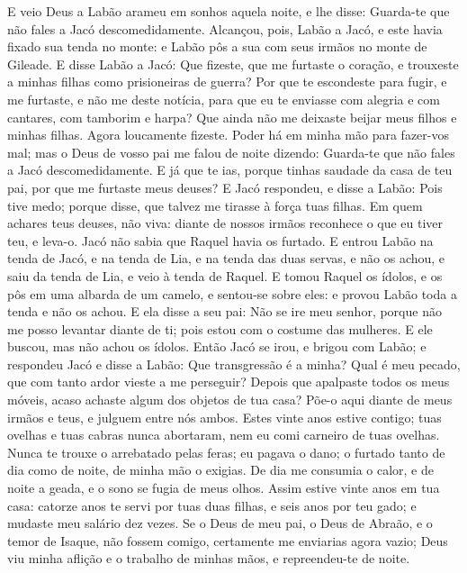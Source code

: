 {{E veio Deus a Labão arameu em sonhos aquela noite, e lhe disse: Guarda-te que não fales a Jacó descomedidamente.
Alcançou, pois, Labão a Jacó, e este havia fixado sua tenda no monte: e Labão pôs a sua com seus irmãos no monte de Gileade.
E disse Labão a Jacó: Que fizeste, que me furtaste o coração, e trouxeste a minhas filhas como prisioneiras de guerra?
Por que te escondeste para fugir, e me furtaste, e não me deste notícia, para que eu te enviasse com alegria e com cantares, com tamborim e harpa?
Que ainda não me deixaste beijar meus filhos e minhas filhas. Agora loucamente fizeste.
Poder há em minha mão para fazer-vos mal; mas o Deus de vosso pai me falou de noite dizendo: Guarda-te que não fales a Jacó descomedidamente.
E já que te ias, porque tinhas saudade da casa de teu pai, por que me furtaste meus deuses?
E Jacó respondeu, e disse a Labão: Pois tive medo; porque disse, que talvez me tirasse à força tuas filhas.
Em quem achares teus deuses, não viva: diante de nossos irmãos reconhece o que eu tiver teu, e leva-o. Jacó não sabia que Raquel havia os furtado.
E entrou Labão na tenda de Jacó, e na tenda de Lia, e na tenda das duas servas, e não os achou, e saiu da tenda de Lia, e veio à tenda de Raquel.
E tomou Raquel os ídolos, e os pôs em uma albarda de um camelo, e sentou-se sobre eles: e provou Labão toda a tenda e não os achou.
E ela disse a seu pai: Não se ire meu senhor, porque não me posso levantar diante de ti; pois estou com o costume das mulheres. E ele buscou, mas não achou os ídolos.
Então Jacó se irou, e brigou com Labão; e respondeu Jacó e disse a Labão: Que transgressão é a minha? Qual é meu pecado, que com tanto ardor vieste a me perseguir?
Depois que apalpaste todos os meus móveis, acaso achaste algum dos objetos de tua casa? Põe-o aqui diante de meus irmãos e teus, e julguem entre nós ambos.
Estes vinte anos estive contigo; tuas ovelhas e tuas cabras nunca abortaram, nem eu comi carneiro de tuas ovelhas.
Nunca te trouxe o arrebatado pelas feras; eu pagava o dano; o furtado tanto de dia como de noite, de minha mão o exigias.
De dia me consumia o calor, e de noite a geada, e o sono se fugia de meus olhos.
Assim estive vinte anos em tua casa: catorze anos te servi por tuas duas filhas, e seis anos por teu gado; e mudaste meu salário dez vezes.
Se o Deus de meu pai, o Deus de Abraão, e o temor de Isaque, não fossem comigo, certamente me enviarias agora vazio; Deus viu minha aflição e o trabalho de minhas mãos, e repreendeu-te de noite.
}}
